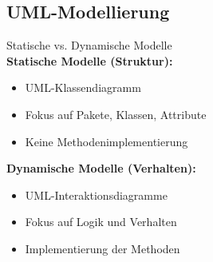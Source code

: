 \pagebreak


\subsection{UML-Modellierung}

\begin{KR}{Statische vs. Dynamische Modelle}\\
\textbf{Statische Modelle (Struktur):}
\begin{itemize}
    \item UML-Klassendiagramm
    \item Fokus auf Pakete, Klassen, Attribute
    \item Keine Methodenimplementierung
\end{itemize}

\textbf{Dynamische Modelle (Verhalten):}
\begin{itemize}
    \item UML-Interaktionsdiagramme
    \item Fokus auf Logik und Verhalten
    \item Implementierung der Methoden
\end{itemize}
\end{KR}

